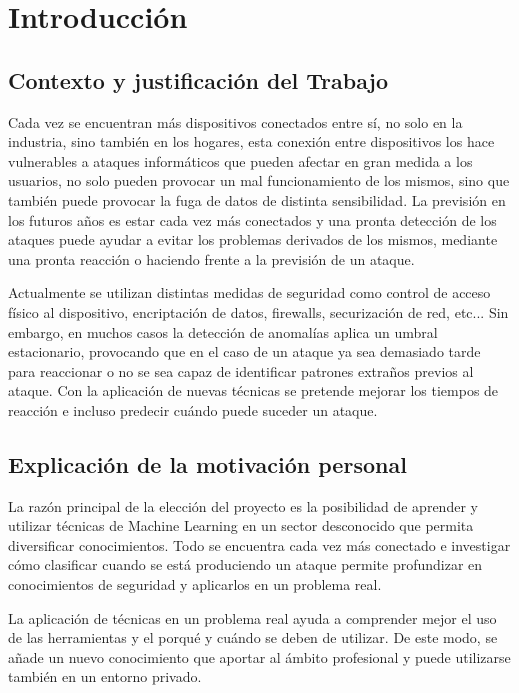 \chapter{Introducción}
\label{chapter:introduccion}


\section{Contexto y justificación del Trabajo}
Cada vez se encuentran más dispositivos conectados entre sí, no solo en la industria, sino también en los hogares, esta conexión entre dispositivos los hace vulnerables a ataques informáticos que pueden afectar en gran medida a los usuarios, no solo pueden provocar un mal funcionamiento de los mismos, sino que también puede provocar la fuga de datos de distinta sensibilidad. La previsión en los futuros años es estar cada vez más conectados y una pronta detección de los ataques puede ayudar a evitar los problemas derivados de los mismos, mediante una pronta reacción o haciendo frente a la previsión de un ataque.

\vspace{0.5cm}

Actualmente se utilizan distintas medidas de seguridad como control de acceso físico al dispositivo, encriptación de datos, firewalls, securización de red, etc... Sin embargo, en muchos casos la detección de anomalías aplica un umbral estacionario, provocando que en el caso de un ataque ya sea demasiado tarde para reaccionar o no se sea capaz de identificar patrones extraños previos al ataque. Con la aplicación de nuevas técnicas se pretende mejorar los tiempos de reacción e incluso predecir cuándo puede suceder un ataque.

\section{Explicación de la motivación personal}
La razón principal de la elección del proyecto es la posibilidad de aprender y utilizar técnicas de Machine Learning en un sector desconocido que permita diversificar conocimientos. Todo se encuentra cada vez más conectado e investigar cómo clasificar cuando se está produciendo un ataque permite profundizar en conocimientos de seguridad y aplicarlos en un problema real.

\vspace{0.5cm}

La aplicación de técnicas en un problema real ayuda a comprender mejor el uso de las herramientas y el porqué y cuándo se deben de utilizar. De este modo, se añade un nuevo conocimiento que aportar al ámbito profesional y puede utilizarse también en un entorno privado.


